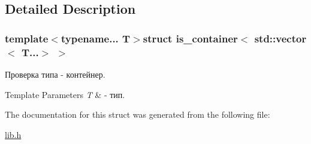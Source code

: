\subsection{Detailed Description}
\subsubsection*{template$<$typename... T$>$struct is\-\_\-container$<$ std\-::vector$<$ T...$>$ $>$}

Проверка типа -\/ контейнер. 


\begin{DoxyTemplParams}{Template Parameters}
{\em T} & -\/ тип. \\
\hline
\end{DoxyTemplParams}


The documentation for this struct was generated from the following file\-:\begin{DoxyCompactItemize}
\item 
\hyperlink{lib_8h}{lib.\-h}\end{DoxyCompactItemize}
